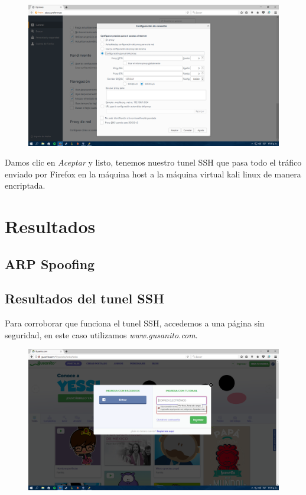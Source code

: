 \documentclass{article}
\begin{document}
\begin{figure}[H]
\centering
\includegraphics[width=1\textwidth]{13-CONFIGURACIONSOCKS}
\end{figure}

Damos clic en \emph{Aceptar} y listo, tenemos nuestro tunel SSH que pasa todo el tr\'afico enviado por Firefox en la m\'aquina host a la m\'aquina virtual kali linux de manera encriptada.

\section{Resultados}
\subsection{ARP Spoofing}
\subsection{Resultados del tunel SSH}
Para corroborar que funciona el tunel SSH, accedemos a una p\'agina sin seguridad, en este caso utilizamos \emph{www.gusanito.com}.

\begin{figure}[H]
\centering
\includegraphics[width=1\textwidth]{14-GUSANITO}
\end{figure}
\end{document}
